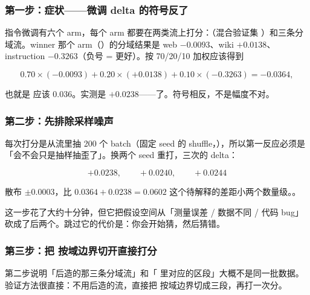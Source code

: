\subsubsection*{第一步：症状——微调 delta 的符号反了}

指令微调有六个 arm，每个 arm 都要在两类流上打分：（混合验证集 ）和三条分域流。winner 那个 arm（）的分域结果是 web $-0.0093$、wiki $+0.0138$、instruction $-0.3263$（负号 = 更好）。按 70/20/10 加权应该得到

\[
0.70\times(-0.0093) + 0.20\times(+0.0138) + 0.10\times(-0.3263) = -0.0364 ,
\]

也就是  应该 0.036。实测是 $+0.0238$——了。符号相反，不是幅度不对。

\subsubsection*{第二步：先排除采样噪声}

 每次打分是从流里抽 200 个 batch（固定 seed 的 shuffle，），所以第一反应必须是「会不会只是抽样抽歪了」。换两个 seed 重打，三次的  delta：

\[
+0.0238,\qquad +0.0240,\qquad +0.0244
\]

散布 $\pm 0.0003$，比 $0.0364+0.0238=0.0602$ 这个待解释的差距小两个数量级。。

这一步花了大约十分钟，但它把假设空间从「测量误差 / 数据不同 / 代码 bug」砍成了后两个。跳过它的代价是：你会开始猜，然后猜错。

\subsubsection*{第三步：把  按域边界切开直接打分}

第二步说明「后造的那三条分域流」和「 里对应的区段」大概不是同一批数据。验证方法很直接：不用后造的流，直接把  按域边界切成三段，再打一次分。

